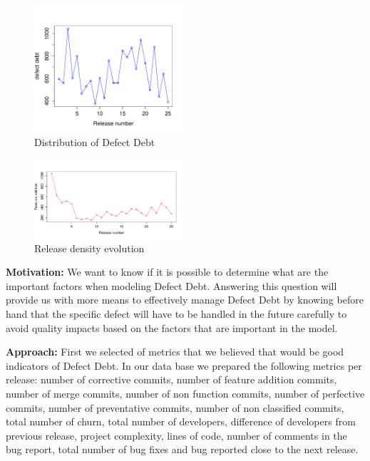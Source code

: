 \begin{figure}[thb!]
	\caption{Distribution of Defect Debt}
	\label{fig:technical_debt}
	\includegraphics[width=0.49\textwidth]{figures/technical_debt}
\end{figure}

\begin{figure}[thb!]
    \caption{Release density evolution}
    \label{fig:feature_addition_releases}
    \includegraphics[width=0.49\textwidth]{figures/feature_addition_releases}
\end{figure}

\vspace{3mm}
\noindent\rqiii
\vspace{3mm}

\noindent\textbf{Motivation:} We want to know if it is possible to determine what are the important factors when modeling Defect Debt. Answering this question will provide us with more means to effectively manage Defect Debt by knowing before hand that the specific defect will have to be handled in the future carefully to avoid quality impacts based on the factors that are important in the model. 

\vspace{1mm}
\noindent\textbf{Approach:} First we selected  of metrics that we believed that would be good indicators of Defect Debt. In our data base we prepared the following metrics per release: number of corrective commits, number of feature addition commits, number of merge commits, number of non function commits, number of perfective commits, number of preventative commits, number of non classified commits, total number of churn, total number of developers, difference of developers from previous release, project complexity, lines of code, number of comments in the bug report, total number of bug fixes and bug reported close to the next release.

